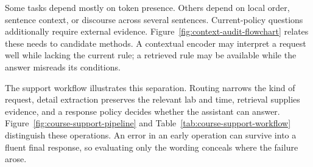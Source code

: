 Some tasks depend mostly on token presence. Others depend on local order, sentence context, or discourse across several sentences. Current-policy questions additionally require external evidence. Figure~\ref{fig:context-audit-flowchart} relates these needs to candidate methods. A contextual encoder may interpret a request well while lacking the current rule; a retrieved rule may be available while the answer misreads its conditions.

\par\addvspace{\intextsep}\noindent\begin{minipage}{\linewidth}
\centering

\label{fig:context-audit-flowchart}\label{fig:nlp-representation-ladder}
\end{minipage}\par\addvspace{\intextsep}

The support workflow illustrates this separation. Routing narrows the kind of request, detail extraction preserves the relevant lab and time, retrieval supplies evidence, and a response policy decides whether the assistant can answer. Figure~\ref{fig:course-support-pipeline} and Table~\ref{tab:course-support-workflow} distinguish these operations. An error in an early operation can survive into a fluent final response, so evaluating only the wording conceals where the failure arose.

